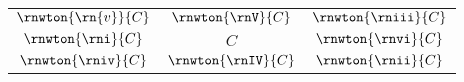 \begin{tabular}{ccc}
    $\rnwton{\rn{v}}{C}$ & $\rnwton{\rnV}{C}$ & $\rnwton{\rniii}{C}$ \\
    $\rnwton{\rni}{C}$ & $C$ & $\rnwton{\rnvi}{C}$ \\
    $\rnwton{\rniv}{C}$ & $\rnwton{\rnIV}{C}$ & $\rnwton{\rnii}{C}$ \\
\end{tabular}

